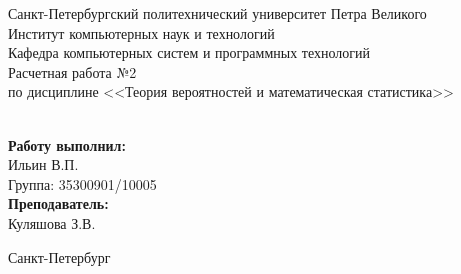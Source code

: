 \begin{titlepage}
    \begin{center}
        \large Санкт-Петербургский политехнический университет Петра Великого\\
        \large Институт компьютерных наук и технологий \\
        \large Кафедра компьютерных систем и программных технологий\\[6cm]


        \huge Расчетная работа №2\\[0.5cm]
        \large по дисциплине <<Теория вероятностей и математическая статистика>>\\[0.1cm]
        \large\textbf{}\\[5cm]
    \end{center}


    \begin{flushright}
        \begin{minipage}{0.25\textwidth}
            \begin{flushleft}

                \large\textbf{Работу выполнил:}\\
                \large Ильин В.П.\\
                \large {Группа:} 35300901/10005\\

                \large \textbf{Преподаватель:}\\
                \large Куляшова З.В.

            \end{flushleft}
        \end{minipage}
    \end{flushright}

    \vfill

    \begin{center}
        \large Санкт-Петербург\\
        \large \the\year
    \end{center}
\end{titlepage}

\vfill
\newpage